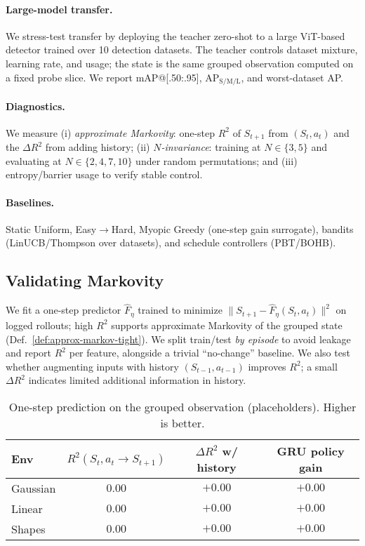 \documentclass[11pt]{article}
\newcommand{\1}{\mathbf{1}}
\begin{document}
\paragraph{Large-model transfer.}
We stress-test transfer by deploying the teacher zero-shot to a large ViT-based detector trained over 10 detection datasets. 
The teacher controls dataset mixture, learning rate, and usage; the state is the same grouped observation computed on a fixed probe slice.
We report mAP@[.50:.95], AP$_\mathrm{S/M/L}$, and worst-dataset AP.

\paragraph{Diagnostics.}
We measure (i) \emph{approximate Markovity}: one-step $R^2$ of $S_{t+1}$ from $(S_t,a_t)$ and the $\Delta R^2$ from adding history; (ii) \emph{$N$-invariance}: training at $N\in\{3,5\}$ and evaluating at $N\in\{2,4,7,10\}$ under random permutations; and (iii) entropy/barrier usage to verify stable control.

\paragraph{Baselines.}
Static Uniform, Easy$\to$Hard, Myopic Greedy (one-step gain surrogate), bandits (LinUCB/Thompson over datasets), and schedule controllers (PBT/BOHB).

\subsection{Validating Markovity}\label{sec:markov-exp}
We fit a one-step predictor $\hat{F}_\eta$ trained to minimize $\|S_{t+1}-\hat{F}_\eta(S_t,a_t)\|^2$ on logged rollouts; high $R^2$ supports approximate Markovity of the grouped state (Def.~\ref{def:approx-markov-tight}).
We split train/test \emph{by episode} to avoid leakage and report $R^2$ per feature, alongside a trivial ``no-change'' baseline.
We also test whether augmenting inputs with history $(S_{t-1},a_{t-1})$ improves $R^2$; a small $\Delta R^2$ indicates limited additional information in history.
\begin{table}[H]
\centering
\caption{One-step prediction on the grouped observation (placeholders). Higher is better.}
\label{tab:markov}
\begin{tabular}{lccc}
\toprule
Env & $R^2(S_t,a_t\!\to\!S_{t+1})$ & $\Delta R^2$ w/ history & GRU policy gain \\
\midrule
Gaussian & $0.00$ & $+0.00$ & $+0.00$ \\
Linear & $0.00$ & $+0.00$ & $+0.00$ \\
Shapes & $0.00$ & $+0.00$ & $+0.00$ \\
\bottomrule
\end{tabular}
\end{table}
\end{document}
